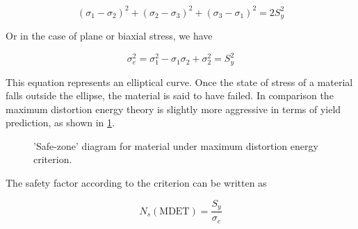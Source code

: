 \documentclass[
10pt,
a4paper,
openany,
svgnames,
]{book}
\begin{document}
\begin{equation}
  (\sigma_1 - \sigma_2)^2 + (\sigma_2 - \sigma_3)^2 + (\sigma_3 - \sigma_1)^2 = 2S_y^2
\end{equation}

Or in the case of plane or biaxial stress, we have

\begin{equation}
  \sigma_e^2 = \sigma_1^2 - \sigma_1\sigma_2 + \sigma_2^2 = S_y^2
\end{equation}

This equation represents an elliptical curve. Once the state of stress of a material falls outside the ellipse, the material is said to have failed.
In comparison the maximum distortion energy theory is slightly more aggressive in terms of yield prediction, as shown in \cref{fig: MDET safe zone}.

\begin{figure}[h]
  \centering
  \caption{'Safe-zone' diagram for material under maximum distortion energy criterion.}
  \label{fig: MDET safe zone}
\end{figure}

The safety factor according to the criterion can be written as

\begin{equation}
  N_s(\text{MDET}) = \frac{S_y}{\sigma_e}
\end{equation}
\end{document}
